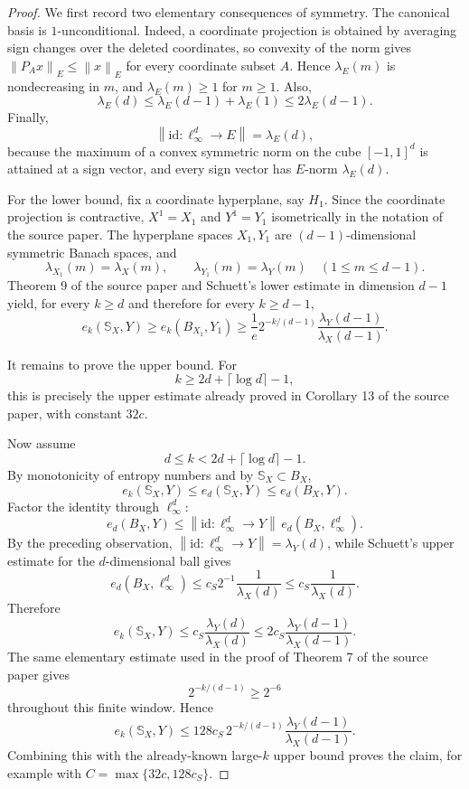 \documentclass[11pt]{article}
\newcommand{\norm}[1]{\left\lVert #1 \right\rVert}
\newcommand{\id}{\mathrm{id}}
\newcommand{\Sphere}{\mathbb{S}}
\begin{document}
\begin{proof}
We first record two elementary consequences of symmetry.  The canonical basis
is \(1\)-unconditional.  Indeed, a coordinate projection is obtained by
averaging sign changes over the deleted coordinates, so convexity of the norm
gives \(\norm{P_A x}_E\le\norm{x}_E\) for every coordinate subset \(A\).
Hence \(\lambda_E(m)\) is nondecreasing in \(m\), and
\(\lambda_E(m)\ge1\) for \(m\ge1\).  Also,
\[
  \lambda_E(d)\le \lambda_E(d-1)+\lambda_E(1)\le 2\lambda_E(d-1).
\]
Finally,
\[
  \norm{\id:\ell_\infty^d\to E}=\lambda_E(d),
\]
because the maximum of a convex symmetric norm on the cube
\([-1,1]^d\) is attained at a sign vector, and every sign vector has
\(E\)-norm \(\lambda_E(d)\).

For the lower bound, fix a coordinate hyperplane, say \(H_1\).  Since the
coordinate projection is contractive, \(X^1=X_1\) and \(Y^1=Y_1\) isometrically
in the notation of the source paper.  The hyperplane spaces \(X_1,Y_1\) are
\((d-1)\)-dimensional symmetric Banach spaces, and
\[
  \lambda_{X_1}(m)=\lambda_X(m),\qquad
  \lambda_{Y_1}(m)=\lambda_Y(m)
  \quad (1\le m\le d-1).
\]
Theorem 9 of the source paper and Schuett's lower estimate in dimension
\(d-1\) yield, for every \(k\ge d\) and therefore for every \(k\ge d-1\),
\[
  e_k(\Sphere_X,Y)
  \ge e_k(B_{X_1},Y_1)
  \ge \frac{1}{e}2^{-k/(d-1)}
      \frac{\lambda_Y(d-1)}{\lambda_X(d-1)}.
\]

It remains to prove the upper bound.  For
\[
  k\ge 2d+\lceil\log d\rceil-1,
\]
this is precisely the upper estimate already proved in Corollary 13 of the
source paper, with constant \(32c\).

Now assume
\[
  d\le k<2d+\lceil\log d\rceil-1.
\]
By monotonicity of entropy numbers and by \(\Sphere_X\subset B_X\),
\[
  e_k(\Sphere_X,Y)\le e_d(\Sphere_X,Y)\le e_d(B_X,Y).
\]
Factor the identity through \(\ell_\infty^d\):
\[
  e_d(B_X,Y)
  \le
  \norm{\id:\ell_\infty^d\to Y}\,
  e_d(B_X,\ell_\infty^d).
\]
By the preceding observation,
\(\norm{\id:\ell_\infty^d\to Y}=\lambda_Y(d)\), while Schuett's upper estimate
for the \(d\)-dimensional ball gives
\[
  e_d(B_X,\ell_\infty^d)
  \le c_S 2^{-1}\frac{1}{\lambda_X(d)}
  \le c_S \frac{1}{\lambda_X(d)}.
\]
Therefore
\[
  e_k(\Sphere_X,Y)
  \le c_S \frac{\lambda_Y(d)}{\lambda_X(d)}
  \le 2c_S \frac{\lambda_Y(d-1)}{\lambda_X(d-1)}.
\]
The same elementary estimate used in the proof of Theorem 7 of the source
paper gives
\[
  2^{-k/(d-1)}\ge 2^{-6}
\]
throughout this finite window.  Hence
\[
  e_k(\Sphere_X,Y)
  \le 128c_S\,2^{-k/(d-1)}
      \frac{\lambda_Y(d-1)}{\lambda_X(d-1)}.
\]
Combining this with the already-known large-\(k\) upper bound proves the
claim, for example with \(C=\max\{32c,128c_S\}\).
\end{proof}
\end{document}
